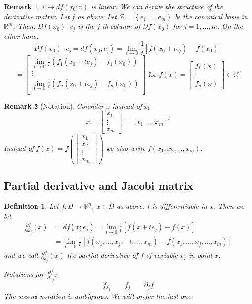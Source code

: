 \documentclass{article}
\newtheorem{definition}{Definition}  \numberwithin{definition}{section}
\newtheorem{remark}{Remark}  \numberwithin{remark}{section}
\newcommand{\set}[1]{\left\{#1\right\}}
\begin{document}
\begin{remark}
  $v \mapsto df(x_0; v)$ is linear. We can derive the structure of the derivative matrix.
  Let $f$ as above. Let $\mathcal B = \set{e_1, \dots, e_m}$ be the canonical basis in $\mathbb R^m$.
  Then: $Df(x_0) \cdot e_j$ is the $j$-th column of $Df(x_0)$ for $j=1,\dots,m$.
  On the other hand,
  \[ Df(x_0) \cdot e_j = df(x_0; e_j) = \lim_{t\to0} \frac1{t} \left[f(x_0 + te_j) - f(x_0)\right] \]
  \[
    = \begin{bmatrix}
      \lim_{t\to 0} \frac1t \left(f_1(x_0 + te_j) - f_1(x_0)\right) \\
      \vdots \\
      \lim_{t\to 0} \frac1t \left(f_n(x_0 + te_j) - f_n(x_0)\right) \\
    \end{bmatrix}
    \text{ for }
    f(x) = \begin{bmatrix} f_1(x) \\ \vdots \\ f_n(x) \end{bmatrix} \in \mathbb R^n
  \]
\end{remark}
\begin{remark}[Notation]
  Consider $x$ instead of $x_0$
  \[ x = \begin{bmatrix} x_1 \\ \vdots \\ x_m \end{bmatrix} = [x_1, \dots, x_m]^t \]
  Instead of $f(x) = f\left(\begin{bmatrix} x_1 \\ x_2 \\ \vdots \\ x_m \end{bmatrix}\right)$
  we also write $f(x_1, x_2, \dots, x_m)$.
\end{remark}

\subsection{Partial derivative and Jacobi matrix}
\begin{definition} %
  Let $f: D \to \mathbb R^n$, $x \in D$ as above. $f$ is differentiable in $x$. Then we let
  \begin{align*}
    \frac{\partial f}{\partial x_j}(x)
      &= df(x; e_j) = \lim_{t\to0} \frac1t \left[f(x + te_j) - f(x)\right] \\
      &= \lim_{t\to0} \frac1t \left[f(x_1, \dots, x_j + t, \dots, x_m) - f(x_1, \dots, x_j, \dots, x_m)\right]
  \end{align*}
  and we call $\frac{\partial f}{\partial x_j} (x)$ the \emph{partial derivative} of $f$ of variable $x_j$ in point $x$.
  
  Notations for $\frac{\partial f}{\partial x_j}$:
  \[ f_{x_j} \qquad f_j \qquad \partial_j f \]
  The second notation is ambiguous. We will prefer the last one.
\end{definition}
\end{document}
